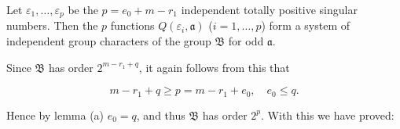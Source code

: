 Let $\varepsilon_1, \ldots, \varepsilon_p$ be the $p = e_0 + m - r_1$ independent totally positive singular numbers. Then the $p$ functions $Q(\varepsilon_i, \mathfrak{a})$ ($i = 1, \ldots, p$) form a system of independent group characters of the group $\mathfrak{B}$ for odd $\mathfrak{a}$.

Since $\mathfrak{B}$ has order $2^{m-r_1+q}$, it again follows from this that

$$m - r_1 + q \geq p = m - r_1 + e_0, \quad e_0 \leq q.$$

Hence by lemma (a) $e_0 = q$, and thus $\mathfrak{B}$ has order $2^p$. With this we have proved:

